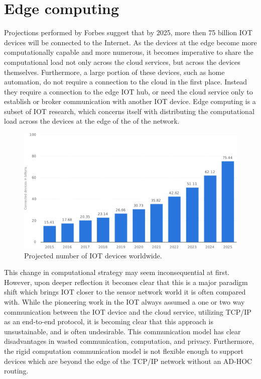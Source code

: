 \section{Edge computing}
Projections performed by Forbes suggest that by 2025, more then 75 billion IOT devices will be connected to the Internet.\cite{forbesiot} As the devices at the edge become more computationally capable and more numerous, it becomes imperative to share the computational load not only across the cloud services, but across the devices themselves. Furthermore, a large portion of these devices, such as home automation, do not require a connection to the cloud in the first place. Instead they require a connection to the edge IOT hub, or need the cloud service only to establish or broker communication with another IOT device. Edge computing is a subset of IOT research, which concerns itself with distributing the computational load across the devices at the edge of the of the network. \cite{satyanarayanan2017emergence}
\begin{figure}[h]
	\centering
	\includegraphics[width=0.8\linewidth]{img/iot_statistics.pdf}	
	\caption{Projected number of IOT devices worldwide.\cite{forbesiot}}
	\label{lit:fig:1}
\end{figure}

This change in computational strategy may seem inconsequential at first. However, upon deeper reflection it becomes clear that this is a major paradigm shift which brings IOT closer to the sensor network world it is often compared with. While the pioneering work in the IOT always assumed a one or two way communication between the IOT device and the cloud service, utilizing TCP/IP as an end-to-end protocol, it is becoming clear that this approach is unsustainable, and is often undesirable. This communication model has clear disadvantages in wasted communication, computation, and privacy. Furthermore, the rigid computation communication model is not flexible enough to support devices which are beyond the edge of the TCP/IP network without an AD-HOC routing. \cite{gagliardi2011content}

